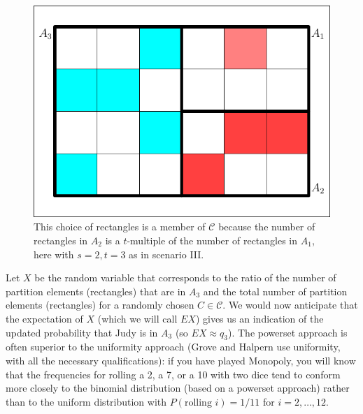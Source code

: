 \documentclass[12pt]{article}
\def\lwv{.6}
\begin{document}
\begin{figure}[h]
  \begin{flushright}
    \begin{minipage}[h]{\lwv\linewidth}
      \includegraphics[width=\textwidth]{partition-1.pdf}
      \caption{This choice of rectangles is a member of
        $\mathcal{C}$ because the number of rectangles in $A_{2}$ is
        a $t$-multiple of the number of rectangles in $A_{1}$,
        here with $s=2,t=3$ as in scenario III.}
      \label{fig:pwstex2}
    \end{minipage}
  \end{flushright}
\end{figure}

Let $X$ be the random variable that corresponds to the ratio of the
number of partition elements (rectangles) that are in $A_{3}$ and the
total number of partition elements (rectangles) for a randomly chosen
$C\in\mathcal{C}$. We would now anticipate that the expectation of $X$
(which we will call $EX$) gives us an indication of the updated
probability that Judy is in $A_{3}$ (so $EX\approx{}q_{3}$). The powerset
approach is often superior to the uniformity approach (Grove and
Halpern use uniformity, with all the necessary qualifications): if you
have played Monopoly, you will know that the frequencies for rolling a
2, a 7, or a 10 with two dice tend to conform more closely to the
binomial distribution (based on a powerset approach) rather than to
the uniform distribution with $P(\mbox{rolling }i)=1/11$ for
$i=2,{\ldots},12$.
\end{document}
